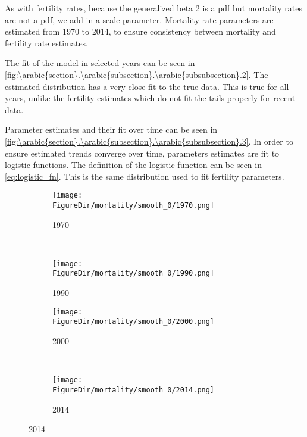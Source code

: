 \documentclass[10pt]{article}
\renewcommand{\thesection}{\arabic{section}}
\renewcommand{\thesubsection}{\thesection.\arabic{subsection}}
\renewcommand{\thesubsubsection}{\thesubsection.\arabic{subsubsection}}
\numberwithin{equation}{subsection}
\newcommand*{\FigureDir}{../../graphs}
\begin{document}
\par As with fertility rates, because the generalized beta 2 is a pdf but mortality rates are not a pdf, we add in a scale parameter. Mortality rate parameters are estimated from 1970 to 2014, to ensure consistency between mortality and fertility rate estimates.

\par The fit of the model in selected years can be seen in \autoref{fig:\thesubsubsection.2}. The estimated distribution has a very close fit to the true data. This is true for all years, unlike the fertility estimates which do not fit the tails properly for recent data.

\par Parameter estimates and their fit over time can be seen in \autoref{fig:\thesubsubsection.3}. In order to ensure estimated trends converge over time, parameters estimates are fit to logistic functions. The definition of the logistic function can be seen in \ref{eq:logistic_fn}. This is the same distribution used to fit fertility parameters.

\begin{figure}[!ht]
   \centering
   \caption{\label{fig:\thesubsubsection.2}Mortality Estimated by Generalized Beta 2}
   \begin{subfigure}{0.5\textwidth}
      \centering
      \texttt{[image: \\FigureDir/mortality/smooth\_0/1970.png]}
      \caption{1970}
   \end{subfigure}%
   ~ %
   \begin{subfigure}{0.5\textwidth}
      \centering
      \texttt{[image: \\FigureDir/mortality/smooth\_0/1990.png]}
      \caption{1990}
   \end{subfigure}%
   \newline
   \begin{subfigure}{0.5\textwidth}
      \centering
      \texttt{[image: \\FigureDir/mortality/smooth\_0/2000.png]}
      \caption{2000}
   \end{subfigure}%
   ~ %
   \begin{subfigure}{0.5\textwidth}
      \centering
      \texttt{[image: \\FigureDir/mortality/smooth\_0/2014.png]}
      \caption{2014}
   \end{subfigure}%
\end{figure}
\end{document}
